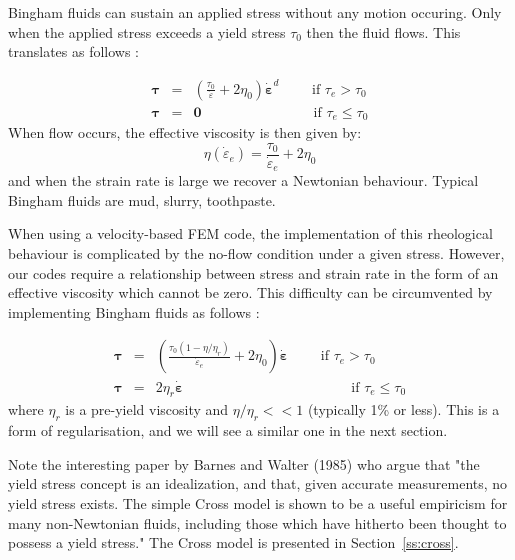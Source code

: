 

Bingham \cite{bingham} fluids can sustain an applied stress without any motion occuring. 
Only when the applied stress exceeds a yield stress $\tau_0$ then the fluid flows. 
This translates as follows \cite{reddybook2}:

\begin{eqnarray}
{\bm \tau} &=& \left(  \frac{\tau_0}{\dot{\varepsilon}} + 2 \eta_0  \right)\dot{\bm \varepsilon}^d \qquad 
\text{ if } {\tau}_{e}>\tau_0 \\
{\bm \tau} &=& {\bm 0} \qquad\qquad\qquad\qquad  \text{if } \tau_{e} \leq \tau_0 
\end{eqnarray}
When flow occurs, the effective viscosity is then given by:
\begin{equation}
\eta(\dot{\varepsilon}_e) = \frac{\tau_0}{\dot{\varepsilon}_e} + 2 \eta_0 
\end{equation}
and when the strain rate is large we recover a Newtonian behaviour.
Typical Bingham fluids are mud, slurry, toothpaste.  

When using a velocity-based FEM code, the implementation of this rheological behaviour 
is complicated by the no-flow condition under a given stress. However, our codes
require a relationship between stress and strain rate in the form of an effective viscosity
which cannot be zero. 
This difficulty can be circumvented by implementing Bingham fluids as follows \cite{reddybook2}:

\begin{eqnarray}
{\bm \tau} &=& \left(  \frac{\tau_0(1-\eta/\eta_r)}{\dot{\varepsilon}_e} 
+ 2 \eta_0  \right)\dot{\bm \varepsilon} \qquad \text{ if } \tau_{e}>\tau_0 \\
{\bm \tau} &=& 2 \eta_r \dot{\bm \varepsilon}  \qquad\qquad\qquad\qquad\qquad\qquad  
\text{if } \tau_{e} \leq \tau_0 
\end{eqnarray}
where $\eta_r$ is a pre-yield viscosity and $\eta/\eta_r<<1$ (typically 1\% or less). This is a form of 
regularisation, and we will see a similar one in the next section.

Note the interesting paper by Barnes and Walter (1985) \cite{bawa85} who argue that 
"the yield stress concept is an idealization, and that, given accurate
measurements, no yield stress exists. The simple Cross model is shown to be a
useful empiricism for many non-Newtonian fluids, including those which have
hitherto been thought to possess a yield stress." The Cross model is presented 
in Section~\ref{ss:cross}.
 

